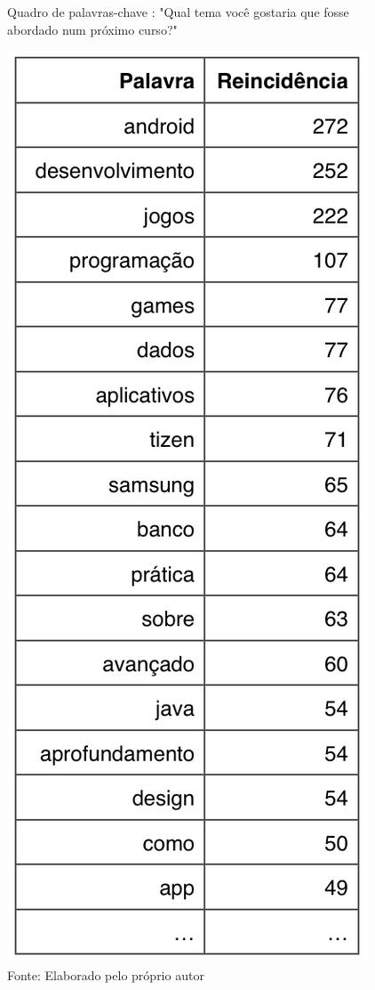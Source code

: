 \begin{figure}[H]
\caption{Quadro de palavras-chave : "Qual tema você gostaria que fosse abordado num próximo curso?"}
\centerline{\includegraphics[scale=0.75]{img/temastopn}}
\label{fig:temastopn}
\caption* {Fonte: Elaborado pelo próprio autor}
\end{figure}

